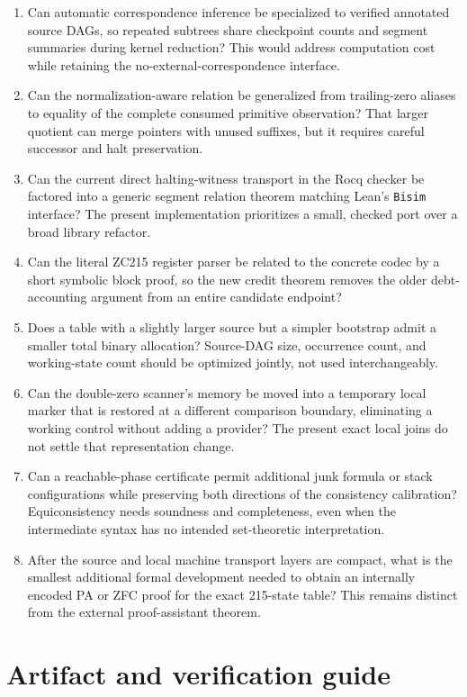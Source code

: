 \documentclass[11pt]{article}
\theoremstyle{definition}\newtheorem{definition}[theorem]{Definition}
\begin{document}
\begin{enumerate}
\item Can automatic correspondence inference be specialized to verified
annotated source DAGs, so repeated subtrees share checkpoint counts and
segment summaries during kernel reduction? This would address computation
cost while retaining the no-external-correspondence interface.
\item Can the normalization-aware relation be generalized from trailing-zero
aliases to equality of the complete consumed primitive observation? That
larger quotient can merge pointers with unused suffixes, but it requires
careful successor and halt preservation.
\item Can the current direct halting-witness transport in the Rocq checker
be factored into a generic segment relation theorem matching Lean's
\texttt{Bisim} interface? The present implementation prioritizes a small,
checked port over a broad library refactor.
\item Can the literal ZC215 register parser be related to the concrete codec
by a short symbolic block proof, so the new credit theorem removes the older
debt-accounting argument from an entire candidate endpoint?
\item Does a table with a slightly larger source but a simpler bootstrap admit
a smaller total binary allocation? Source-DAG size, occurrence count, and
working-state count should be optimized jointly, not used interchangeably.
\item Can the double-zero scanner's memory be moved into a temporary local
marker that is restored at a different comparison boundary, eliminating a
working control without adding a provider? The present exact local joins
do not settle that representation change.
\item Can a reachable-phase certificate permit additional junk formula or
stack configurations while preserving both directions of the consistency
calibration? Equiconsistency needs soundness and completeness, even when the
intermediate syntax has no intended set-theoretic interpretation.
\item After the source and local machine transport layers are compact, what
is the smallest additional formal development needed to obtain an internally
encoded PA or ZFC proof for the exact 215-state table? This remains distinct
from the external proof-assistant theorem.
\end{enumerate}

\section{Artifact and verification guide}
\end{document}
